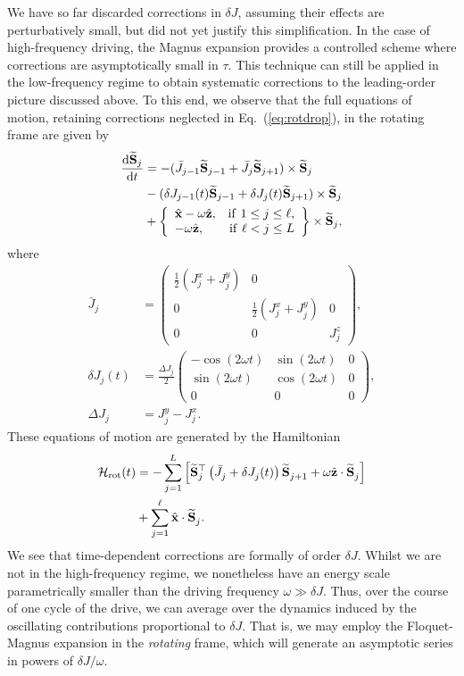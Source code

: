 \documentclass[aps,pre,twocolumn,notitlepage,floats,10pt]{revtex4-1}
\def\d{\mathrm{d}}
\def\ptop{{\vphantom\top}}
\newcommand{\beA}{\begin{equation}\begin{aligned}}
\newcommand{\eeA}{\end{aligned}\end{equation}}
\begin{document}
We have so far discarded corrections in $\delta J$, assuming their effects are
perturbatively small, but did not yet justify this simplification.  In the case
of high-frequency driving, the Magnus expansion provides a controlled scheme
where corrections are asymptotically small in $\tau$.
This technique can still be applied in the low-frequency regime to obtain
systematic corrections to the leading-order picture discussed above.
To this end, we observe that the full equations of motion, retaining
corrections neglected in Eq.~(\ref{eq:rotdrop}), in the rotating frame are
given by
\beA
\frac{\d \widetilde{\bf S}_j}{\d t}
&= -(\bar{J}_{j-1} \widetilde{\bf S}_{j-1} + \bar{J}_j \widetilde{\bf S}_{j+1}) \times \widetilde{\bf S}_{j} \\
&
-(\delta {J}_{j-1}(t) \widetilde{\bf S}_{j-1} + \delta{J}_j(t) \widetilde{\bf S}_{j+1}) \times \widetilde{\bf S}_{j}\\
&+ \left\{\begin{array}{lr} \hat{\bf x} - \omega \hat{\bf z}, & {\rm if}\ 1 \leq j \leq \ell, \\
  -\omega \hat{\bf z},                   & {\rm if}\ \ell < j \leq L
\end{array}
\right\}
\times
\widetilde{\bf S}_j,
\eeA
where
\beA
\bar{J}_j &=  \begin{pmatrix} \frac{1}{2}\left(J_j^x + J_j^y\right) & 0 \\ 0 & \frac{1}{2}\left(J_j^x + J_j^y\right) & 0 \\ 0 & 0 & J_j^z \end{pmatrix},
\\
\delta J_j(t) &= \frac{\Delta J_j}{2} \begin{pmatrix} -\cos (2\omega t) & \sin (2\omega t) & 0 \\ \sin (2\omega t) & \cos (2\omega t) & 0 \\ 0 & 0 & 0 \end{pmatrix}
,
\\
\Delta J_j &= J_j^y - J_j^x
.
\eeA
These equations of motion are generated by the Hamiltonian
\beA
\mathcal{H}_{\rm rot}(t) &=
-\sum_{j=1}^L
\left[
  \widetilde{\bf S}_j^\top \left(\bar{J}_j^\ptop + \delta J_j^\ptop(t) \right) \widetilde{\bf S}_{j+1}^\ptop
  +\omega\hat{\bf z} \cdot \widetilde{\bf S}_j^\ptop
  \right]
\\
& +
\sum_{j=1}^\ell
\hat{\bf x} \cdot \widetilde{\bf S}_j^\ptop
.
\label{eq:Hrott}
\eeA
We see that time-dependent corrections are formally of order $\delta J$.
Whilst we are not in the high-frequency regime, we nonetheless have an energy
scale parametrically smaller than the driving frequency $\omega \gg \delta J$.
Thus, over the course of one cycle of the drive, we can average over the
dynamics induced by the oscillating contributions proportional to $\delta J$.
That is, we may employ the Floquet-Magnus expansion in the \emph{rotating}
frame, which will generate an asymptotic series in powers of $\delta J/\omega$.
\end{document}
